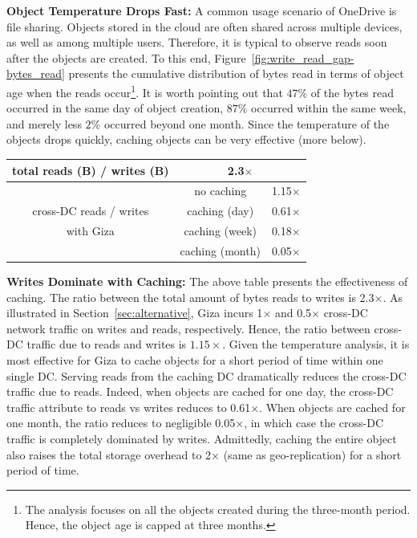 {\bf Object Temperature Drops Fast:} A common usage scenario of OneDrive is file sharing. Objects stored in the cloud are often shared across multiple devices, as well as among multiple users. Therefore, it is typical to observe reads soon after the objects are created. To this end, Figure~\ref{fig:write_read_gap-bytes_read} presents the cumulative distribution of bytes read in terms of object age when the reads occur\footnote{The analysis focuses on all the objects created during the three-month period. Hence, the object age is capped at three months.}. It is worth pointing out that $47\%$ of the bytes read occurred in the same day of object creation, $87\%$ occurred within the same week, and merely less $2\%$ occurred beyond one month. Since the temperature of the objects drops quickly, caching objects can be very effective (more below). 

\begin{table}[h]
\footnotesize
\centering
\begin{tabular}{|c||c|c|}
\hline \hline
total reads (B) / writes (B) 	& \multicolumn{2}{c|}{2.3$\times$}
\\ \hline \hline
	& no caching		& 1.15$\times$
\\ \cline{2-3}
cross-DC reads / writes
	& caching (day)		& 0.61$\times$ 
\\ \cline{2-3}
with Giza
	& caching (week)	& 0.18$\times$ 
\\ \cline{2-3}
	& caching (month)	& 0.05$\times$ 
\\ \hline \hline
\end{tabular}
\label{tab:caching}
\end{table}
{\bf Writes Dominate with Caching:} The above table presents the effectiveness of caching. The ratio between the total amount of bytes reads to writes is 2.3$\times$. 
As illustrated in Section~\ref{sec:alternative}, Giza incurs 1$\times$ and 0.5$\times$
cross-DC network traffic on writes and reads, respectively. Hence, the ratio
between cross-DC traffic due to reads and writes is $1.15\times$. Given the
temperature analysis, it is most effective for Giza to cache objects for a short
period of time within one single DC. Serving reads from the caching DC
dramatically reduces the cross-DC traffic due to reads. Indeed, when objects are
cached for one day, the cross-DC traffic attribute to reads vs writes reduces to
0.61$\times$. When objects are cached for one month, the ratio reduces to
negligible 0.05$\times$, in which case the cross-DC traffic is completely dominated by
writes. Admittedly, caching the entire object also raises the total storage
overhead to 2$\times$ (same as geo-replication) for a short period of time.

